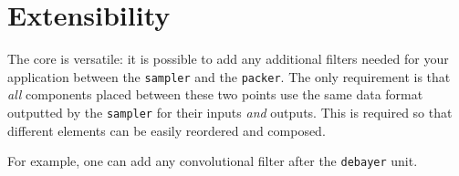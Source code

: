 \documentclass{article}
\begin{document}
\section{Extensibility}
The core is versatile: it is possible to add any additional filters needed for your application between the \texttt{sampler} and the \texttt{packer}. The only requirement is that \emph{all} components placed between these two points use the same data format outputted by the \texttt{sampler} for their inputs \emph{and} outputs. This is required so that different elements can be easily reordered and composed.

For example, one can add any convolutional filter after the \texttt{debayer} unit.
\end{document}
